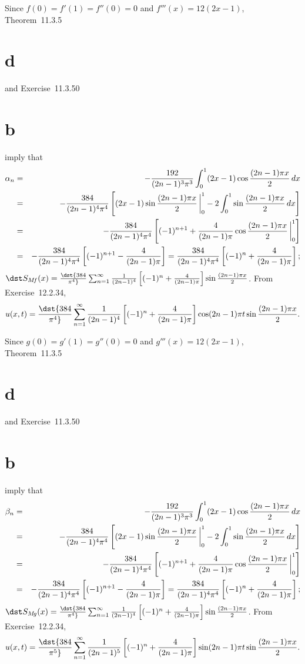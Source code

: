 \documentclass[dvips]{book}
\renewcommand{\exer}[1]{\par\medskip\;\noindent{\color{red}\bf #1.}}
\numberwithin{example}{section}
\numberwithin{equation}{section}
\numberwithin{theorem}{section}
\numberwithin{table}{section}
\numberwithin{figure}{section}
\newcommand{\lims}[2]{\,\bigg|_{#1}^{#2}}
\begin{document}
\exer{12.2.44}
Since $f(0)=f'(1)=f''(0)=0$ and $f'''(x)=12(2x-1)$,
Theorem~11.3.5\part{d} and Exercise~11.3.50\part{b}
imply that
\begin{eqnarray*}
\alpha_n&=&-{192\over(2n-1)^3\pi^3}\int_0^1(2x-1)
\cos{(2n-1)\pi x\over2}\,dx\\
&=&-{384\over(2n-1)^4\pi^4}
\left[(2x-1)\sin{(2n-1)\pi x\over2}\lims01
-2\int_0^1\sin{(2n-1)\pi x\over2}\,dx\right]\\
&=&-{384\over(2n-1)^4\pi^4}
\left[(-1)^{n+1}+{4\over(2n-1)\pi}
\cos{(2n-1)\pi x\over2}\lims01\right]\\
&=&-{384\over(2n-1)^4\pi^4}
\left[(-1)^{n+1}-{4\over(2n-1)\pi}\right]
={384\over(2n-1)^4\pi^4}
\left[(-1)^n+{4\over(2n-1)\pi}\right];
\end{eqnarray*}
$\dst S_{M\!f}(x)=\dst{384\over\pi^4}\sum_{n=1}^\infty{1\over(2n-1)^4}
\left[(-1)^n+{4\over(2n-1)\pi}\right]\sin{(2n-1)\pi x\over2}$.
From Exercise~12.2.34,
$$
u(x,t)=\dst{384\over\pi^4}\sum_{n=1}^\infty{1\over(2n-1)^4}
\left[(-1)^n+{4\over(2n-1)\pi}\right]\cos(2n-1)\pi
t\sin{(2n-1)\pi x\over2}.
$$


\exer{12.2.46}
Since $g(0)=g'(1)=g''(0)=0$ and $g'''(x)=12(2x-1)$,
Theorem~11.3.5\part{d} and Exercise~11.3.50\part{b}
imply that
\begin{eqnarray*}
\beta_n&=&-{192\over(2n-1)^3\pi^3}\int_0^1(2x-1)
\cos{(2n-1)\pi x\over2}\,dx\\
&=&-{384\over(2n-1)^4\pi^4}
\left[(2x-1)\sin{(2n-1)\pi x\over2}\lims01
-2\int_0^1\sin{(2n-1)\pi x\over2}\,dx\right]\\
&=&-{384\over(2n-1)^4\pi^4}
\left[(-1)^{n+1}+{4\over(2n-1)\pi}
\cos{(2n-1)\pi x\over2}\lims01\right]\\
&=&-{384\over(2n-1)^4\pi^4}
\left[(-1)^{n+1}-{4\over(2n-1)\pi}\right]
={384\over(2n-1)^4\pi^4}
\left[(-1)^n+{4\over(2n-1)\pi}\right];
\end{eqnarray*}
$\dst S_{M\!g}(x)=\dst{384\over\pi^4}\sum_{n=1}^\infty{1\over(2n-1)^4}
\left[(-1)^n+{4\over(2n-1)\pi}\right]\sin{(2n-1)\pi x\over2}$.
From Exercise~12.2.34,
$$
u(x,t)=\dst{384\over\pi^5}\sum_{n=1}^\infty{1\over(2n-1)^5}
\left[(-1)^n+{4\over(2n-1)\pi}\right]\sin(2n-1)\pi
t\sin{(2n-1)\pi x\over2}.
$$
\end{document}
